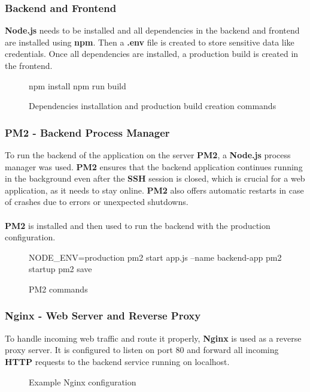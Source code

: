 \documentclass[a4paper,12pt]{report}
\begin{document}
\subsubsection{Backend and Frontend}
\textbf{Node.js} needs to be installed and all dependencies in the backend and frontend are installed using \textbf{npm}. Then a \textbf{.env} file is created to store sensitive data like credentials. Once all dependencies are installed, a production build is created in the frontend.
\begin{figure}[H]
	\begin{terminal}
		npm install
		npm run build
	\end{terminal}
	\caption{Dependencies installation and production build creation commands}
\end{figure}
\subsubsection{PM2 - Backend Process Manager}
To run the backend of the application on the server \textbf{PM2}, a \textbf{Node.js} process manager was used. \textbf{PM2} ensures that the backend application continues running in the background even after the \textbf{SSH} session is closed, which is crucial for a web application, as it needs to stay online. \textbf{PM2} also offers automatic restarts in case of crashes due to errors or unexpected shutdowns.\\\\
\textbf{PM2} is installed and then used to run the backend with the production configuration.
\begin{figure}[H]
	\begin{terminal}
		NODE_ENV=production pm2 start app.js --name backend-app
		pm2 startup
		pm2 save
	\end{terminal}
	\caption{PM2 commands}
\end{figure}
\subsubsection{Nginx - Web Server and Reverse Proxy}
To handle incoming web traffic and route it properly, \textbf{Nginx} is used as a reverse proxy server. It is configured to listen on port 80 and forward all incoming \textbf{HTTP} requests to the backend service running on localhost.
\begin{figure}[H]
	\caption{Example Nginx configuration}
\end{figure}
\end{document}
